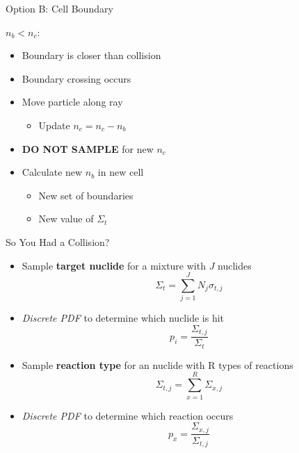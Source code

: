 \documentclass[xcolor=x11names,compress]{beamer}
\renewcommand{\(}{\begin{columns}}
\renewcommand{\)}{\end{columns}}
\newcommand{\<}[1]{\begin{column}{#1}}
\renewcommand{\>}{\end{column}}
\begin{document}
\begin{frame}{Option B: Cell Boundary}

  \underline{$n_b < n_c$}:
  \begin{itemize}
    \item Boundary is closer than collision
    \item \alert{Boundary crossing occurs}
  \end{itemize}
    \vspace*{0.5 em}
  \pause

  \begin{itemize}
  \item Move particle along ray
  \begin{itemize}
    \item Update $n_c = n_c - n_b$
  \end{itemize}
  \item \textbf{DO NOT SAMPLE} for new $n_c$
  \vspace*{1 em}
  \pause
  \item Calculate new $n_b$ in new cell
  \begin{itemize}
    \item New set of boundaries
    \item New value of $\Sigma_t$
  \end{itemize}
\end{itemize}

\end{frame}


\begin{frame}{So You Had a Collision?}

\begin{itemize}
  \item Sample \textbf{target nuclide} for a mixture with $J$ nuclides
    \[\Sigma_t = \sum_{j=1}^J N_j \sigma_{t,j}\]
  \item \textit{Discrete PDF} to determine which nuclide is hit
    \[p_i = \frac{\Sigma_{t,j}}{\Sigma_t}\]
  \pause
  \item Sample \textbf{reaction type} for an nuclide with R types of reactions
     \[\Sigma_{t,j} = \sum_{x=1}^R \Sigma_{x,j}\]
  \item \textit{Discrete PDF} to determine which reaction occurs
    \[p_x = \frac{\Sigma_{x,j}}{\Sigma_{t,j}}\]
\end{itemize}

\end{frame}
\end{document}
